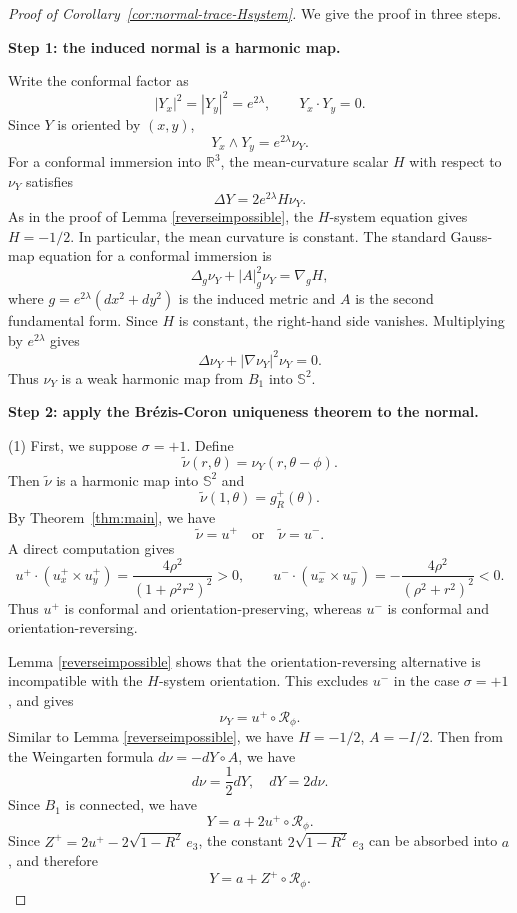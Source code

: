 \documentclass[11pt]{amsart}
\numberwithin{equation}{section}
\theoremstyle{remark}
\newcommand{\B}{B_1}
\newcommand{\Sph}{\mathbb{S}^2}
\newcommand{\RR}{\mathbb R}
\newcommand{\eiii}{e_3}
\newcommand{\Rot}{\mathcal R}
\begin{document}
\begin{proof}[Proof of Corollary~\ref{cor:normal-trace-Hsystem}]
We give the proof in three steps.

\smallskip
\noindent\textbf{Step 1: the induced normal is a harmonic map.}

Write the conformal factor as
\[
|Y_x|^2=|Y_y|^2=e^{2\lambda},
\qquad
Y_x\cdot Y_y=0.
\]
Since $Y$ is oriented by $(x,y)$,
\[
Y_x\wedge Y_y=e^{2\lambda}\nu_Y.
\]
For a conformal immersion into $\RR^3$, the mean-curvature scalar $H$ with respect to $\nu_Y$ satisfies
\[
\Delta Y=2e^{2\lambda}H\nu_Y.
\]
As in the proof of Lemma \ref{reverseimpossible}, the $H$-system equation gives $H=-1/2$.
In particular, the mean curvature is constant. The standard Gauss-map equation for a conformal immersion is
\[
\Delta_g\nu_Y+|A|_g^2\nu_Y=\nabla_g H,
\]
where $g=e^{2\lambda}(dx^2+dy^2)$ is the induced metric and $A$ is the second fundamental form. Since $H$ is constant, the right-hand side
vanishes. Multiplying by $e^{2\lambda}$ gives
\[
\Delta \nu_Y+|\nabla \nu_Y|^2\nu_Y=0.
\]
Thus $\nu_Y$ is a weak harmonic map from $\B$ into $\Sph$.

\smallskip
\noindent\textbf{Step 2: apply the Br\'ezis-Coron uniqueness theorem to the normal.}

(1) First, we suppose $\sigma=+1$. Define
\[
\widetilde\nu(r,\theta)=\nu_Y(r,\theta-\phi).
\]
Then $\widetilde\nu$ is a harmonic map into $\Sph$ and
\[
\widetilde\nu(1,\theta)=g_R^+(\theta).
\]
By Theorem~\ref{thm:main}, we have
\[
\widetilde\nu=u^+\quad\text{or}\quad \widetilde\nu=u^-.
\]
A direct computation gives
\[
u^+\cdot(u^+_x\times u^+_y)
=
\frac{4\rho^2}{(1+\rho^2r^2)^2}>0,
\qquad
u^-\cdot(u^-_x\times u^-_y)
=
-\frac{4\rho^2}{(\rho^2+r^2)^2}<0.
\]
Thus $u^+$ is conformal and orientation-preserving, whereas $u^-$ is conformal and orientation-reversing.

Lemma \ref{reverseimpossible} shows that the orientation-reversing alternative is incompatible with the $H$-system orientation. This excludes
$u^-$ in the case $\sigma=+1$, and gives
\[
\nu_Y=u^+\circ\Rot_\phi.
\]
Similar to Lemma \ref{reverseimpossible}, we have $H=-1/2$, $A=-I/2$. Then from the Weingarten formula $d\nu =-dY\circ A$, we have
\[ d\nu =\frac12 dY, \quad d Y=2 d \nu. \]
Since $B_1$ is connected, we have
\[
Y=a+2u^+\circ\Rot_\phi.
\]
Since $Z^+=2u^+-2\sqrt{1-R^2}\,\eiii$, the constant $2\sqrt{1-R^2}\,\eiii$ can be absorbed into $a$, and therefore
\[
Y=a+Z^+\circ\Rot_\phi.
\]


\end{proof}
\end{document}
